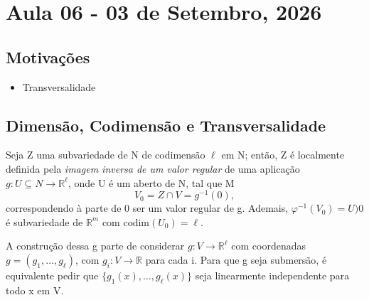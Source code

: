 \documentclass[../differential_topology.tex]{subfiles}
\begin{document}
\section{Aula 06 - 03 de Setembro, 2026}
\subsection{Motivações}
\begin{itemize}
	\item Transversalidade
\end{itemize}
\subsection{Dimensão, Codimensão e Transversalidade}
Seja Z uma subvariedade de N de codimensão \(\ell \) em N; então, Z é localmente definida pela \textit{imagem inversa de um valor regular} de uma aplicação \(g:U\subseteq N\rightarrow \mathbb{R}^{\ell }\), onde U é um aberto de N, tal que M
\[
	V_{0} = Z\cap V = g^{-1}(0),
\]
correspondendo à parte de 0 ser um valor regular de g. Ademais, \(\varphi^{-1}(V_{0})=U)0\) é subvariedade de \(\mathbb{R}^{m}\) com \(\mathrm{codim}(U_{0})=\ell \).

A construção dessa g parte de considerar \(g:V\rightarrow \mathbb{R}^{\ell }\) com coordenadas \(g=(g_1, \dotsc , g_{\ell})\), com \(g_{i}:V\rightarrow \mathbb{R}\) para cada i.
Para que g seja submersão, é equivalente pedir que \(\{g_1(x), \dotsc , g_{\ell }(x)\}\) seja linearmente independente para todo x em V.
\end{document}
